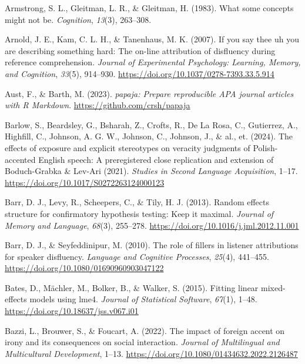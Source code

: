 \documentclass[
  man,floatsintext]{apa7}
\newlength{\cslhangindent}
\newlength{\cslentryspacingunit} %
\newenvironment{CSLReferences}[2] %
 {%
  \setlength{\parindent}{0pt}
  \ifodd #1
  \let\oldpar\par
  \def\par{\hangindent=\cslhangindent\oldpar}
  \fi
  \setlength{\parskip}{#2\cslentryspacingunit}
 }%
 {}
\begin{document}
\hypertarget{refs}{}
\begin{CSLReferences}{1}{0}
\leavevmode{}%
Armstrong, S. L., Gleitman, L. R., \& Gleitman, H. (1983). What some concepts might not be. \emph{Cognition}, \emph{13}(3), 263--308.

\leavevmode{}%
Arnold, J. E., Kam, C. L. H., \& Tanenhaus, M. K. (2007). If you say thee uh you are describing something hard: The on-line attribution of disfluency during reference comprehension. \emph{Journal of Experimental Psychology: Learning, Memory, and Cognition}, \emph{33}(5), 914--930. \url{https://doi.org/10.1037/0278-7393.33.5.914}

\leavevmode{}%
Aust, F., \& Barth, M. (2023). \emph{{papaja}: {Prepare} reproducible {APA} journal articles with {R Markdown}}. \url{https://github.com/crsh/papaja}

\leavevmode{}%
Barlow, S., Beardsley, G., Bsharah, Z., Crofts, R., De La Rosa, C., Gutierrez, A., Highfill, C., Johnson, A. G. W., Johnson, C., Johnson, J., \& al., et. (2024). The effects of exposure and explicit stereotypes on veracity judgments of {P}olish-accented {E}nglish speech: A preregistered close replication and extension of {B}oduch-{G}rabka \& {L}ev-{A}ri (2021). \emph{Studies in Second Language Acquisition}, 1--17. \url{https://doi.org/10.1017/S0272263124000123}

\leavevmode{}%
Barr, D. J., Levy, R., Scheepers, C., \& Tily, H. J. (2013). Random effects structure for confirmatory hypothesis testing: Keep it maximal. \emph{Journal of Memory and Language}, \emph{68}(3), 255--278. \url{https://doi.org/10.1016/j.jml.2012.11.001}

\leavevmode{}%
Barr, D. J., \& Seyfeddinipur, M. (2010). The role of fillers in listener attributions for speaker disfluency. \emph{Language and Cognitive Processes}, \emph{25}(4), 441--455. \url{https://doi.org/10.1080/01690960903047122}

\leavevmode{}%
Bates, D., Mächler, M., Bolker, B., \& Walker, S. (2015). Fitting linear mixed-effects models using {lme4}. \emph{Journal of Statistical Software}, \emph{67}(1), 1--48. \url{https://doi.org/10.18637/jss.v067.i01}

\leavevmode{}%
Bazzi, L., Brouwer, S., \& Foucart, A. (2022). The impact of foreign accent on irony and its consequences on social interaction. \emph{Journal of Multilingual and Multicultural Development}, 1--13. \url{https://doi.org/10.1080/01434632.2022.2126487}


\end{CSLReferences}
\end{document}
